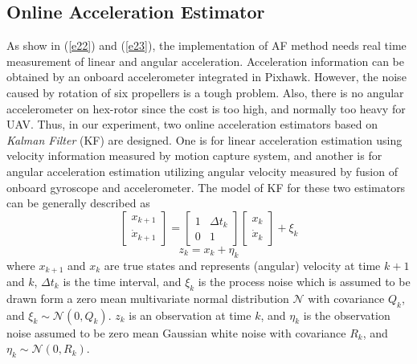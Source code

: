 \documentclass[letterpaper, 10 pt, conference]{ieeeconf}  %
\begin{document}
\subsection{Online Acceleration Estimator}

As show in (\ref{e22}) and (\ref{e23}), the implementation of AF method needs real time measurement of linear and angular acceleration.
Acceleration information can be obtained by an onboard accelerometer integrated in Pixhawk.
However, the noise caused by rotation of six propellers is a tough problem.
Also, there is no angular accelerometer on hex-rotor since the cost is too high, and normally too heavy for UAV.
Thus, in our experiment, two online acceleration estimators based on \textsl{Kalman Filter} (KF) are designed.
One is for linear acceleration estimation using velocity information measured by motion capture system, and another is for angular acceleration estimation utilizing angular velocity measured by fusion of onboard gyroscope and accelerometer.
The model of KF for these two estimators can be generally described as
\begin{equation}
    \begin{bmatrix}
        x_{k+1} \\
        \dot{x}_{k+1}
    \end{bmatrix} = 
    \begin{bmatrix}
        1 & \Delta t_k \\
        0 & 1
    \end{bmatrix}
    \begin{bmatrix}
       x_k \\ \dot{x}_k
    \end{bmatrix}
    + \xi_k
    \label{e24}
\end{equation}
\begin{equation}
    z_k = x_k + \eta_k
    \label{e25}
\end{equation}
where $x_{k+1}$ and $x_k$ are true states and represents (angular) velocity at time $k+1$ and $k$, $\Delta t_k$ is the time interval,
and $\xi_k$ is the process noise which is assumed to be drawn form a zero mean multivariate normal distribution $\mathcal{N}$ with covariance $Q_k$, and $\xi_k\sim\mathcal{N}(0,Q_k)$.
$z_k$ is an observation at time $k$, and $\eta_k$ is the observation noise assumed to be zero mean Gaussian white noise with covariance $R_k$, and $\eta_k\sim\mathcal{N}(0,R_k)$.
\end{document}
